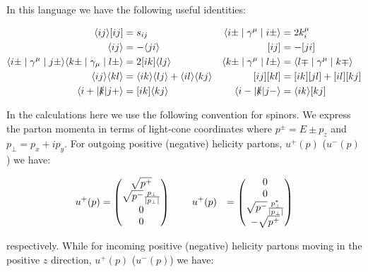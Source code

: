 	In this language we have the following useful identities:

	\begin{align*}
		\langle ij\rangle[ij] &= s_{ij} & \langle i\pm\mid\gamma^\mu\mid i\pm\rangle &= 2k_i^\mu \\
		\langle ij\rangle &= -\langle ji\rangle & [ij] &= -[ji] \\
		\langle i\pm\mid\gamma^\mu\mid j\pm\rangle\langle k\pm\mid\gamma_\mu\mid l\pm\rangle &=
		2[ik]\langle l j\rangle & \langle k\pm\mid\gamma^\mu\mid l\pm\rangle &=
		\langle l\mp\mid\gamma^\mu\mid k\mp\rangle \\
		\langle i j\rangle\langle k l\rangle &=
		\langle i k\rangle\langle l j\rangle + \langle i l\rangle\langle k j\rangle & [ij][kl] &= [ik][jl]+[il][kj] \\
		\langle i+|\slashed k|j+\rangle &= [ik]\langle kj\rangle & \langle i-|\slashed k|j-\rangle &= \langle ik\rangle [kj]
	\end{align*}

	In the calculations here we use the following convention for spinors.  We express the parton momenta in terms
	of light-cone coordinates where $p^\pm=E\pm p_z$ and $p_{\perp} = p_x + ip_y$.  For outgoing positive (negative) helicity partons,
	$u^+(p)$ ($u^-(p)$) we have:

	\begin{align}
	    u^+(p) &= \begin{pmatrix}
	           \sqrt{p^+} \\
	           \sqrt{p^-}\frac{p_\perp}{|p_\perp|} \\
	           0 \\
	           0 \\
	         \end{pmatrix}\hspace{0.75cm}
	    u^+(p) &= \begin{pmatrix}
	           0 \\
	           0 \\
	           \sqrt{p^-}\frac{p_\perp^*}{|p_\perp|} \\
	           -\sqrt{p^+} \\
	         \end{pmatrix}
	\end{align}

	respectively.  While for incoming positive (negative) helicity partons moving in the positive $z$ direction,
	$u^+(p)$ ($u^-(p)$) we have:

